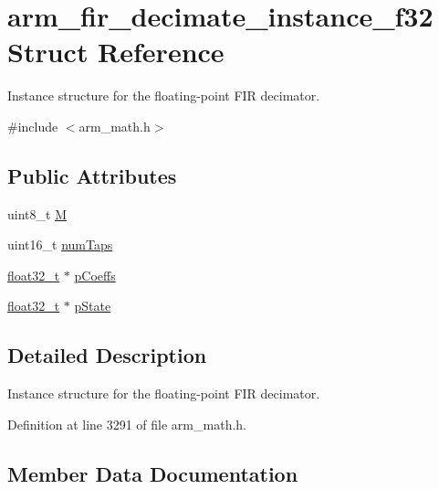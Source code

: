 \hypertarget{structarm__fir__decimate__instance__f32}{}\section{arm\+\_\+fir\+\_\+decimate\+\_\+instance\+\_\+f32 Struct Reference}
\label{structarm__fir__decimate__instance__f32}


Instance structure for the floating-\/point F\+IR decimator.  




{\ttfamily \#include $<$arm\+\_\+math.\+h$>$}

\subsection*{Public Attributes}
\begin{DoxyCompactItemize}
\item 
uint8\+\_\+t \hyperlink{structarm__fir__decimate__instance__f32_a76a8b2161731638eb3d67f277919f95d}{M}
\item 
uint16\+\_\+t \hyperlink{structarm__fir__decimate__instance__f32_a2aa2986129db8affef03ede88dd45a03}{num\+Taps}
\item 
\hyperlink{arm__math_8h_a4611b605e45ab401f02cab15c5e38715}{float32\+\_\+t} $\ast$ \hyperlink{structarm__fir__decimate__instance__f32_a268a8b0e80a3d9764baf33e4bc10dde2}{p\+Coeffs}
\item 
\hyperlink{arm__math_8h_a4611b605e45ab401f02cab15c5e38715}{float32\+\_\+t} $\ast$ \hyperlink{structarm__fir__decimate__instance__f32_a5bddf29aaaf2011d2e3bcec59a83f633}{p\+State}
\end{DoxyCompactItemize}


\subsection{Detailed Description}
Instance structure for the floating-\/point F\+IR decimator. 

Definition at line 3291 of file arm\+\_\+math.\+h.



\subsection{Member Data Documentation}
\mbox{\label{structarm__fir__decimate__instance__f32_a76a8b2161731638eb3d67f277919f95d}} 
